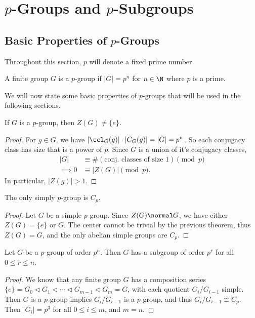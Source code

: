 \documentclass[a4paper]{scrartcl}
\begin{document}
\section{$p$-Groups and $p$-Subgroups}

\subsection{Basic Properties of $p$-Groups}

Throughout this section, $p$ will denote a fixed prime number.

\begin{definition}[$p$-group]
	A finite group $G$ is a $p$-group if $|G| = p^n$ for $n \in \N$ where $p$ is a prime.
\end{definition}


We will now state some basic properties of $p$-groups that will be used in the following sections.

\begin{theorem}
	If $G$ is a $p$-group, then $Z(G) \neq \{e\}$.
\end{theorem}
\begin{proof}
	For $g \in G$, we have $|\ccl_G(g)| \cdot |C_G(g)| = |G| = p^n$. So each conjugacy class has size that is a power of $p$. 
	Since $G$ is a union of it's conjugacy classes, 
	\begin{align*}
		|G| &\equiv \#(\text{conj. classes of size 1}) \pmod{p}  \\
\implies 0 &\equiv |Z(G)| \pmod{p}.
	\end{align*}
	In particular, $|Z(g)| > 1$.
\end{proof}

\begin{corollary}
	The only simply $p$-group is $C_p$.
\end{corollary}
\begin{proof}
	Let $G$ be a simple $p$-group. Since $Z(G) \normal G$, we have either $Z(G) = \{e\}$ or $G$. The center cannot be trivial by the previous theorem, thus $Z(G) = G$, and the only abelian simple groups are $C_p$.
\end{proof}

\begin{corollary}
	Let $G$ be a $p$-group of order $p^n$. Then $G$ has a subgroup of order $p^r$ for all $0 \leq r \leq n$.
\end{corollary}
\begin{proof}
	We know that any finite group $G$ has a composition series $\{e\} = G_0 \triangleleft G_1 \triangleleft \cdots \triangleleft G_{m - 1} \triangleleft G_m = G$, with each quotient $G_i / G_{i - 1}$ simple. Then $G$ is a $p$-group implies $G_i/G_{i - 1}$ is a $p$-group, and thus $G_i/G_{i - 1} \cong C_p$. Then $|G_i| = p^3$ for all $0 \leq i \leq m$, and $m = n$. 
\end{proof}
\end{document}
